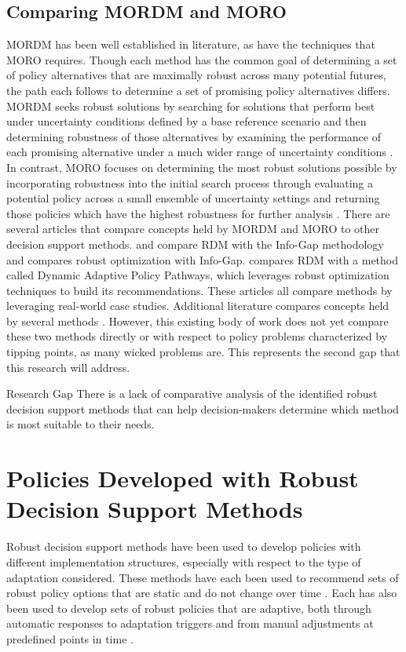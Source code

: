     \subsection{Comparing MORDM and MORO}\label{gap-comaprativework}
    MORDM has been well established in literature, as have the techniques that MORO requires. Though each method has the common goal of determining a set of policy alternatives that are maximally robust across many potential futures, the path each follows to determine a set of promising policy alternatives differs. MORDM seeks robust solutions by searching for solutions that perform best under uncertainty conditions defined by a base reference scenario and then determining robustness of those alternatives by examining the performance of each promising alternative under a much wider range of uncertainty conditions \citep{Kasprzyk2013}. In contrast, MORO focuses on determining the most robust solutions possible by incorporating robustness into the initial search process through evaluating a potential policy across a small ensemble of uncertainty settings and returning those policies which have the highest robustness for further analysis \citep{HamaratLoonen2014}. There are several articles that compare concepts held by MORDM and MORO to other decision support methods. \citet{Hall2012} and \citet{Matrosov2013b} compare RDM with the Info-Gap methodology and \citet{Roach2015} compares robust optimization with Info-Gap. \citet{Kwakkel2016Compare} compares RDM with a method called Dynamic Adaptive Policy Pathways, which leverages robust optimization techniques to build its recommendations. These articles all compare methods by leveraging real-world case studies. Additional literature compares concepts held by several methods \citep{Dittrich2016, Herman2015, Maier2016}. However, this existing body of work does not yet compare these two methods directly or with respect to policy problems characterized by tipping points, as many wicked problems are. This represents the second gap that this research will address.
    
    \begin{researchbox}{Research Gap \thegapcounter}\label{gap-comparativework}
        There is a lack of comparative analysis of the identified robust decision support methods that can help decision-makers determine which method is most suitable to their needs.
    \end{researchbox}

\section{Policies Developed with Robust Decision Support Methods}\label{gap-policies}
Robust decision support methods have been used to develop policies with different implementation structures, especially with respect to the type of adaptation considered. These methods have each been used to recommend sets of robust policy options that are static and do not change over time \citep{Sozuer2016,Kasprzyk2013}. Each has also been used to develop sets of robust policies that are adaptive, both through automatic responses to adaptation triggers and from manual adjustments at predefined points in time \citep{HamaratLoonen2014, Kwakkel2015, Trindade2017}.

